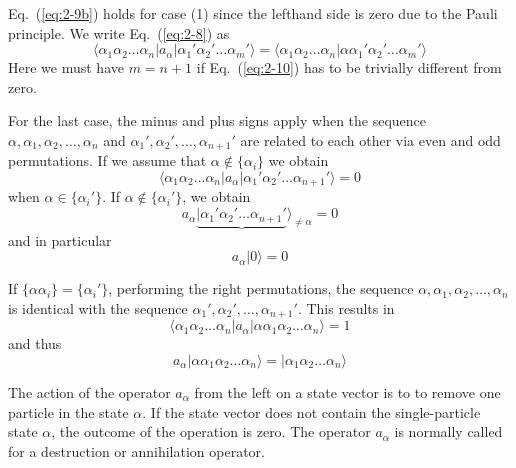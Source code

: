 \documentclass[graybox,sectrefs,envcountresetchap,open=right]{svmonodo}
\begin{document}
Eq.~(\ref{eq:2-9b}) holds for case (1) since the lefthand side is zero due to the Pauli principle. We write
Eq.~(\ref{eq:2-8}) as
\begin{equation}
	\langle\alpha_1\alpha_2 \dots \alpha_n|a_\alpha|\alpha_1'\alpha_2' \dots \alpha_m'\rangle = 
	\langle \alpha_1\alpha_2 \dots \alpha_n|\alpha\alpha_1'\alpha_2' \dots \alpha_m'\rangle \label{eq:2-10}
\end{equation}
Here we must have $m = n+1$ if Eq.~(\ref{eq:2-10}) has to be trivially different from zero.



For the last case, the minus and plus signs apply when the sequence 
$\alpha ,\alpha_1, \alpha_2, \dots, \alpha_n$ and 
$\alpha_1', \alpha_2', \dots, \alpha_{n+1}'$ are related to each other via even and odd permutations.
If we assume that  $\alpha \notin \{\alpha_i\}$ we obtain 
\begin{equation}
	\langle\alpha_1\alpha_2 \dots \alpha_n|a_\alpha|\alpha_1'\alpha_2' \dots \alpha_{n+1}'\rangle = 0 \label{eq:2-12}
\end{equation}
when $\alpha \in \{\alpha_i'\}$. If $\alpha \notin \{\alpha_i'\}$, we obtain
\begin{equation}
	a_\alpha\underbrace{|\alpha_1'\alpha_2' \dots \alpha_{n+1}'}\rangle_{\neq \alpha} = 0 \label{eq:2-13a}
\end{equation}
and in particular
\begin{equation}
	a_\alpha |0\rangle = 0 \label{eq:2-13b}
\end{equation}


If $\{\alpha\alpha_i\} = \{\alpha_i'\}$, performing the right permutations, the sequence
$\alpha ,\alpha_1, \alpha_2, \dots, \alpha_n$ is identical with the sequence
$\alpha_1', \alpha_2', \dots, \alpha_{n+1}'$. This results in
\begin{equation}
	\langle\alpha_1\alpha_2 \dots \alpha_n|a_\alpha|\alpha\alpha_1\alpha_2 \dots \alpha_{n}\rangle = 1 \label{eq:2-14}
\end{equation}
and thus
\begin{equation}
	a_\alpha |\alpha\alpha_1\alpha_2 \dots \alpha_{n}\rangle = |\alpha_1\alpha_2 \dots \alpha_{n}\rangle \label{eq:2-15}
\end{equation}



The action of the operator 
$a_\alpha$ from the left on a state vector  is to to remove  one particle in the state
$\alpha$. 
If the state vector does not contain the single-particle state $\alpha$, the outcome of the operation is zero.
The operator  $a_\alpha$ is normally called for a destruction or annihilation operator.
\end{document}
